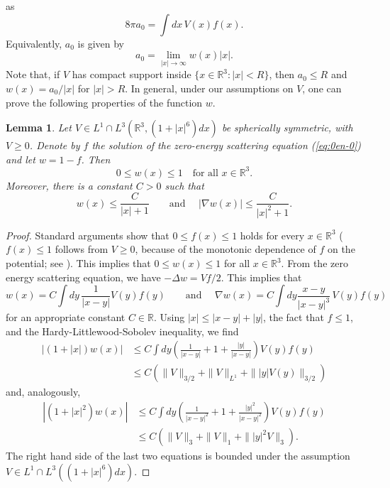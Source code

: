 \documentclass[11pt,a4paper]{article}
\newtheorem{lem}[thm]{Lemma}
\newcommand{\bR}{{\mathbb R}}
\begin{document}
as
\[
  8 \pi a_0 = \int dx \, V(x) f(x).
\]
Equivalently, $a_0$ is given by 
\[
  a_0 = \lim_{|x| \to \infty} w(x)|x|.
\]
Note that, if $V$ has compact support inside $\{ x \in \bR^3 : |x| < R \}$, then $a_0 \leq R$ and $w(x) = a_0/|x|$ for $|x| > R$. In general, under our assumptions on $V$, one can prove the following properties of the function $w$.
\begin{lem}\label{lm:w}
Let $V \in L^1 \cap L^3(\bR^3, (1+|x|^6)dx)$ be spherically symmetric, with
$V \geq 0$. Denote by $f$ the solution of the zero-energy scattering
equation (\ref{eq:0en-0}) and let $w = 1 - f$. Then 
\[ 0 \leq w(x) \leq 1 \quad \text{for all } x \in \bR^3. \]
Moreover, there is a constant $C>0$ such that
\begin{equation}\label{eq:bdw} w(x) \leq \frac{C}{|x|+1} \qquad \text{and } \quad  |\nabla w (x)| \leq \frac{C}{|x|^2 + 1}. \end{equation}
\end{lem}
\begin{proof}
Standard arguments show that $0 \leq f (x) \leq 1$ holds for every $x \in \bR^3$ ($f(x) \leq 1$ follows from $V \geq 0$, because of the monotonic dependence of $f$ on the potential; see \cite[Appendix C]{LSSY}). This implies that $0 \leq w (x) \leq 1$ for all $x \in \bR^3$. From the zero energy scattering equation, we have $-\Delta w = Vf /2$. This implies that 
\[ w(x) = C \int dy \, \frac{1}{|x-y|} V (y) f (y) \qquad \text{and } \quad  \nabla w (x) = C \int dy \frac{x-y}{|x-y|^3} \, V (y) f (y)  \]
for an appropriate constant $C \in \bR$. 
Using $|x| \le  |x-y| + |y|$, the fact that $f \le 1$, and
the Hardy-Littlewood-Sobolev inequality, we find
\begin{align*}
  |(1+|x|)w(x)| & \le C \int dy \left( \frac{1}{|x-y|} + 1 +
\frac{|y|}{|x-y|} \right) V(y) f(y) \\& \le C (\| V \|_{3/2} + \| V \|_{L^1} + \| |y| V(y) \|_{3/2} )
\end{align*}
and, analogously, 
\begin{align*}
\left| (1+|x|^2) w (x) \right| &\leq C \int dy \left( \frac{1}{|x-y|^2} + 1 + \frac{|y|^2}{|x-y|^2} \right) V(y) f (y) 
\\ &\leq C \left( \| V \|_3 + \| V \|_1 + \| |y|^2 V \|_3 \right).
\end{align*}
The right hand side of the last two equations is bounded under the assumption $V \in L^1 \cap L^3 ((1+|x|^6) dx)$. 
\end{proof}
\end{document}

